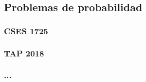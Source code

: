 \documentclass[../main.tex]{subfiles}
\begin{document}
\subsection{Problemas de probabilidad}
\subsubsection{CSES 1725}
\subsubsection{TAP 2018}
\subsubsection{...}
\end{document}
